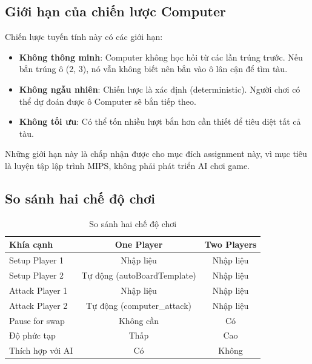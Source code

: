 \subsection{Giới hạn của chiến lược Computer}

Chiến lược tuyến tính này có các giới hạn:

\begin{itemize}
    \item \textbf{Không thông minh}: Computer không học hỏi từ các lần trúng trước. Nếu bắn trúng ô (2, 3), nó vẫn không biết nên bắn vào ô lân cận để tìm tàu.
    
    \item \textbf{Không ngẫu nhiên}: Chiến lược là xác định (deterministic). Người chơi có thể dự đoán được ô Computer sẽ bắn tiếp theo.
    
    \item \textbf{Không tối ưu}: Có thể tốn nhiều lượt bắn hơn cần thiết để tiêu diệt tất cả tàu.
\end{itemize}

Những giới hạn này là chấp nhận được cho mục đích assignment này, vì mục tiêu là luyện tập lập trình MIPS, không phải phát triển AI chơi game.

\subsection{So sánh hai chế độ chơi}

\begin{table}[H]
\centering
\begin{tabular}{|l|c|c|}
\hline
\textbf{Khía cạnh} & \textbf{One Player} & \textbf{Two Players} \\
\hline
Setup Player 1 & Nhập liệu & Nhập liệu \\
\hline
Setup Player 2 & Tự động (autoBoardTemplate) & Nhập liệu \\
\hline
Attack Player 1 & Nhập liệu & Nhập liệu \\
\hline
Attack Player 2 & Tự động (computer\_attack) & Nhập liệu \\
\hline
Pause for swap & Không cần & Có \\
\hline
Độ phức tạp & Thấp & Cao \\
\hline
Thích hợp với AI & Có & Không \\
\hline
\end{tabular}
\caption{So sánh hai chế độ chơi}
\end{table}

